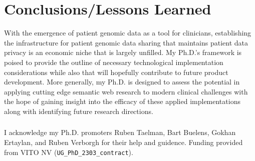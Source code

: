 \documentclass[runningheads]{llncs}
\begin{document}
\section{Conclusions/Lessons Learned}

With the emergence of patient genomic data as a tool for clinicians, establishing the infrastructure for patient genomic data sharing that maintains patient data privacy is an economic niche that is largely unfilled. 
My Ph.D.'s framework is poised to provide the outline of necessary technological implementation considerations while also that will hopefully contribute to future product development. 
More generally, my Ph.D. is designed to assess the potential in applying cutting edge semantic web research to modern clinical challenges with the hope of gaining insight into the efficacy of these applied implementations along with identifying future research directions.



\subsubsection{\ackname} 
I acknowledge my Ph.D. promoters Ruben Taelman, Bart Buelens, Gokhan Ertaylan, and Ruben Verborgh for their help and guidence.
Funding provided from VITO NV (\verb|UG_PhD_2303_contract|). 



\end{document}
